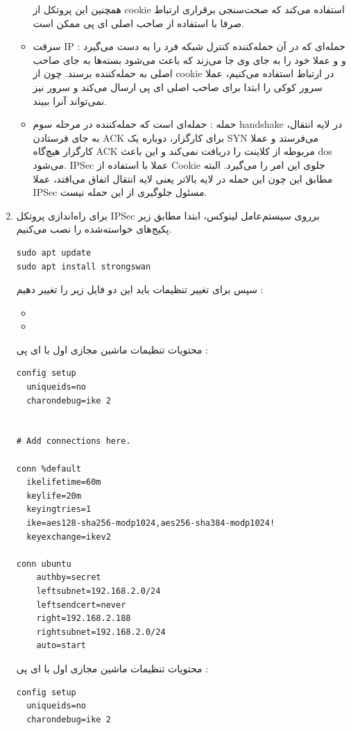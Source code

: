 \begin{enumerate}[label=\alph*)]
\begin{itemize}
      همچنین این پروتکل از cookie استفاده می‌کند که صحت‌سنجی برقراری ارتباط 
      صرفا با استفاده از صاحب اصلی ای پی ممکن است.
      \item سرقت IP : 
        حمله‌ای که در آن حمله‌کننده کنترل شبکه فرد را به دست می‌گیرد و 
        و عملا خود را به جای وی جا می‌زند که باعث می‌شود بسته‌ها به جای صاحب اصلی به حمله‌کننده برسند.
        چون از cookie در ارتباط استفاده می‌کنیم، عملا سرور کوکی 
        را ابتدا برای صاحب اصلی ای پی ارسال می‌کند و سرور نیز نمی‌تواند آنرا ببیند.
      \item حمله  : 
      حمله‌ای است که حمله‌کننده در مرحله سوم handshake در لایه انتقال،‌ به جای فرستادن 
      ACK برای کارگزار،‌ دوباره یک SYN می‌فرستد و عملا 
      کارگزار هیچ‌گاه ACK مربوطه از کلاینت را دریافت نمی‌کند و این باعث dos می‌شود.
      IPSec عملا با استفاده از Cookie 
      جلوی این امر را می‌گیرد. البته مطابق این
      چون این حمله در لایه بالاتر یعنی لایه انتقال اتفاق می‌افتد، عملا IPSec مسئول جلوگیری از این حمله نیست.

    \end{itemize}

\item 
برای راه‌اندازی پروتکل IPSec 
برروی سیستم‌عامل لینوکس، ابتدا مطابق زیر پکیج‌های خواسته‌شده را 
نصب می‌کنیم.
\begin{latin}
  \begin{lstlisting}
sudo apt update
sudo apt install strongswan
\end{lstlisting}
\end{latin}
سپس برای تغییر تنظیمات باید این دو فایل زیر را تغییر دهیم : 
\begin{itemize}
  \item {}
  \item {}
\end{itemize}
محتویات تنظیمات ماشین مجازی اول با ای پی 
\textbf{} : 
\begin{latin}
  \begin{lstlisting}
config setup
  uniqueids=no
  charondebug=ike 2


# Add connections here.

conn %default
  ikelifetime=60m
  keylife=20m
  keyingtries=1
  ike=aes128-sha256-modp1024,aes256-sha384-modp1024!
  keyexchange=ikev2

conn ubuntu
    authby=secret
    leftsubnet=192.168.2.0/24
    leftsendcert=never
    right=192.168.2.188
    rightsubnet=192.168.2.0/24
    auto=start
\end{lstlisting}
\end{latin}
محتویات تنظیمات ماشین مجازی اول با ای پی 
\textbf{} : 
\begin{latin}
  \begin{lstlisting}
config setup
  uniqueids=no
  charondebug=ike 2



\end{lstlisting}
\end{latin}
\end{enumerate}
